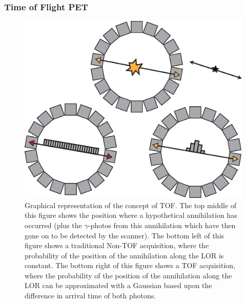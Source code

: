             \subsubsection{Time of Flight PET} \label{sec:time_of_flight_pet}
                \begin{figure}
                    \centering
                    
                    \includegraphics[width=1.0\linewidth]{figures/background_tof.png}
                    
                    \captionsetup{singlelinecheck=false}
                    \caption{
                        Graphical representation of the concept of \gls{TOF}. The top middle of this figure shows the position where a hypothetical annihilation has occurred (plus the $\gamma$-photos from this annihilation which have then gone on to be detected by the scanner). The bottom left of this figure shows a traditional \gls{Non-TOF} acquisition, where the probability of the position of the annihilation along the \gls{LOR} is constant. The bottom right of this figure shows a \gls{TOF} acquisition, where the probability of the position of the annihilation along the \gls{LOR} can be approximated with a Gaussian based upon the difference in arrival time of both photons.
                    }
                    \label{fig:time_of_flight_pet_tof}
                \end{figure}
                
